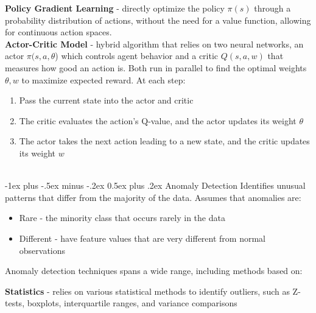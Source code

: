 \documentclass[10pt,landscape]{article}
\makeatletter
\renewcommand{\section}{\@startsection{section}{1}{0mm}%
                                {-1ex plus -.5ex minus -.2ex}%
                                {0.5ex plus .2ex}%
                                {\normalfont\large\bfseries}}
\makeatother
\begin{document}
\begin{multicols}{3}
\textbf{Policy Gradient Learning} - directly optimize the policy $\pi(s)$ through a probability distribution of actions, without the need for a value function, allowing for continuous action spaces.  \\
\smallskip
\textbf{Actor-Critic Model} - hybrid algorithm that relies on two neural networks, an actor $\pi(s,a,\theta$) which controls agent behavior  and a critic $Q(s,a,w)$ that measures how good an action is. Both run in parallel to find the optimal weights $\theta, w$ to maximize expected reward. At each step:
\begin{enumerate}[leftmargin=5mm]
\itemsep -.4mm
\item Pass the current state into the actor and critic
\item The critic evaluates the action's Q-value, and the actor updates its weight $\theta$
\item The actor takes the next action leading to a new state, and the critic updates its weight $w$
\end{enumerate}
\columnbreak

\textcolor{white}{.}\vspace{-3mm}\\ %
\section{Anomaly Detection}
Identifies unusual patterns that differ from the majority of the data. Assumes that anomalies are:
\begin{itemize}[label={--},leftmargin=4mm]
\itemsep -.4mm
\item Rare - the minority class that occurs rarely in the data
\item Different - have feature values that are very different from normal observations
\end{itemize}
\smallskip
Anomaly detection techniques spans a wide range, including methods based on:

\textbf{Statistics} - relies on various statistical methods to identify outliers, such as Z-tests, boxplots, interquartile ranges, and variance comparisons


\end{multicols}
\end{document}
